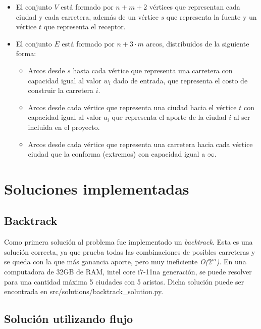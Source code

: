\documentclass[10pt]{article} %
\begin{document}
	\begin{itemize}
		\item El conjunto $V$ est\'a formado por $n+m+2$ v\'ertices que representan cada ciudad y cada carretera, adem\'as de un v\'ertice $s$ que representa la fuente y un v\'ertice $t$ que representa el receptor. 
		\item El conjunto $E$ est\'a formado por $n+3\cdot m $ arcos, distribuidos de la siguiente forma:
		\begin{itemize}
			\item Arcos desde $s$ hasta cada v\'ertice que representa una carretera con capacidad igual al valor $w_i$ dado de entrada, que representa el costo de construir la carretera $i$.
			
			\item Arcos desde cada v\'ertice que representa una ciudad hacia el v\'ertice $t$ con capacidad igual al valor $a_i$ que representa el aporte de la ciudad $i$ al ser incluida en el proyecto.
			
			\item Arcos desde cada v\'ertice que representa una carretera hacia cada v\'ertice ciudad que la conforma (extremos) con capacidad igual a $\infty$.
		\end{itemize}
	\end{itemize}
	
	\section{Soluciones implementadas}
	
	\subsection{Backtrack}
		Como primera solución al problema fue implementado un \textit{backtrack}. Esta es una solución correcta, ya que prueba todas las combinaciones de posibles carreteras y se queda con la que más ganancia aporte, pero muy ineficiente \textit{O($2^{m}$)}. En una computadora de 32GB de RAM, intel core i7-11na generación, se puede resolver para una cantidad máxima 5 ciudades con 5 aristas. Dicha solución puede ser encontrada en src/solutions/backtrack\_solution.py.
	
	\subsection{Soluci\'on utilizando flujo}
	
\end{document}
